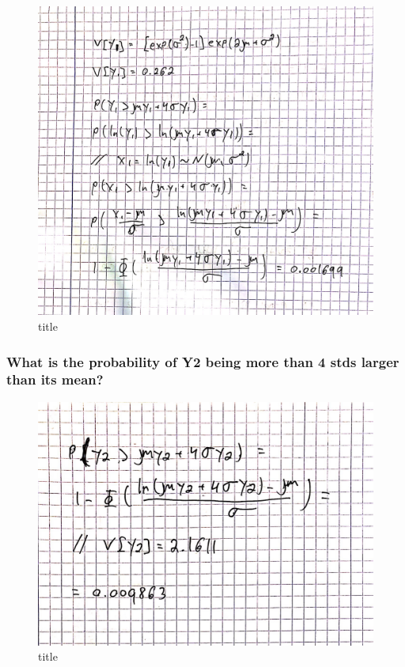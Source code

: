 \documentclass[11pt]{article}
\makeatletter
\def\maxwidth{\ifdim\Gin@nat@width>\linewidth\linewidth
    \else\Gin@nat@width\fi}
\let\Oldincludegraphics\includegraphics
\renewcommand{\includegraphics}[1]{\Oldincludegraphics[width=.8\maxwidth]{#1}}
\makeatother
\begin{document}
    \begin{figure}
\centering
\includegraphics{4-3.JPG}
\caption{title}
\end{figure}

    \hypertarget{what-is-the-probability-of-y2-being-more-than-4-stds-larger-than-its-mean}{%
\subsubsection{What is the probability of Y2 being more than 4 stds
larger than its
mean?}\label{what-is-the-probability-of-y2-being-more-than-4-stds-larger-than-its-mean}}

    \begin{figure}
\centering
\includegraphics{4-4.JPG}
\caption{title}
\end{figure}
\end{document}
